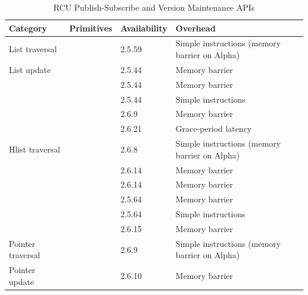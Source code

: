 \begin{table}[tb]
\footnotesize
\centering\tymin=1.0in\tymax=1.6in
\begin{tabulary}{5in}{l|L|l|L}
Category &
	Primitives &
		Availability &
			Overhead \\
\hline
\hline
List traversal &
	 &
		2.5.59 &
			{ \raggedright
			  Simple instructions (memory barrier on Alpha) } \\
\hline
List update &
	 &
		2.5.44 &
			Memory barrier \\
&
	 &
		2.5.44 &
			Memory barrier \\
&
	 &
		2.5.44 &
			Simple instructions \\
&
	 &
		2.6.9 &
			Memory barrier \\
&
	 &
		2.6.21 &
			Grace-period latency \\
\hline
Hlist traversal &
	 &
		2.6.8 &
			{ \raggedright
			  Simple instructions (memory barrier on Alpha) } \\
&
	 &
		2.6.14 &
			Memory barrier \\
&
	 &
		2.6.14 &
			Memory barrier \\
&
	 &
		2.5.64 &
			Memory barrier \\
&
	 &
		2.5.64 &
			Simple instructions \\
&
	 &
		2.6.15 &
			Memory barrier \\
\hline
Pointer traversal &
	 &
		2.6.9 &
			{ \raggedright
			  Simple instructions (memory barrier on Alpha) } \\
\hline
Pointer update &
	 &
		2.6.10 &
			Memory barrier \\
\end{tabulary}
\caption{RCU Publish-Subscribe and Version Maintenance APIs}
\label{tab:defer:RCU Publish-Subscribe and Version Maintenance APIs}
\end{table}

